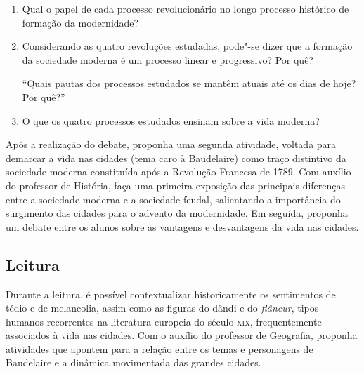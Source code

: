 \documentclass[12pt]{extarticle}
\begin{document}
\begin{enumerate}
\item Qual o papel de cada processo revolucionário no longo processo histórico de formação da modernidade?

\item Considerando as quatro revoluções estudadas, pode"-se dizer que a formação da sociedade moderna é um processo linear e progressivo? Por quê?

``Quais pautas dos processos estudados se mantêm atuais até os dias de hoje? Por quê?''

\item O que os quatro processos estudados ensinam sobre a vida moderna?
\end{enumerate}


Após a realização do debate, proponha uma segunda atividade, voltada para demarcar a vida nas cidades (tema caro à Baudelaire) como traço distintivo da sociedade moderna constituída após a Revolução Francesa de 1789. Com auxílio do professor de História, faça uma primeira exposição das principais diferenças entre a sociedade moderna e a sociedade feudal, salientando a importância do surgimento das cidades para o advento da modernidade. Em seguida, proponha um debate entre os alunos sobre as vantagens e desvantagens da vida nas cidades.




\subsection{Leitura}

Durante a leitura, é possível contextualizar historicamente
os sentimentos de tédio e de melancolia, assim como as figuras do dândi
e do \textit{flâneur}, tipos humanos recorrentes na literatura europeia do
século \textsc{xix}, frequentemente associados à vida nas cidades. Com o auxílio do professor de Geografia, proponha atividades que apontem para a relação entre os temas e personagens de Baudelaire e a dinâmica movimentada das grandes cidades. 
\end{document}
